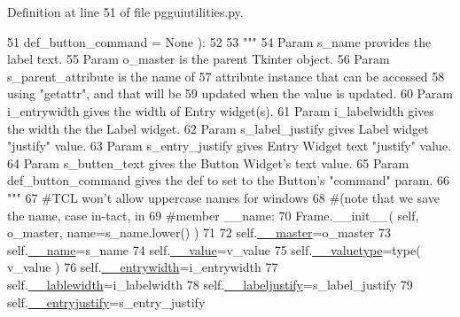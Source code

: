 Definition at line 51 of file pgguiutilities.\+py.


\begin{DoxyCode}
51             def\_button\_command = \textcolor{keywordtype}{None} ):
52         
53         \textcolor{stringliteral}{"""}
54 \textcolor{stringliteral}{        Param s\_name provides the label text.}
55 \textcolor{stringliteral}{        Param o\_master is the parent Tkinter object.}
56 \textcolor{stringliteral}{        Param s\_parent\_attribute is the name of }
57 \textcolor{stringliteral}{            attribute instance that can be accessed}
58 \textcolor{stringliteral}{            using "getattr", and that will be}
59 \textcolor{stringliteral}{            updated when the value is updated.}
60 \textcolor{stringliteral}{        Param i\_entrywidth gives the width of Entry widget(s).}
61 \textcolor{stringliteral}{        Param i\_labelwidth gives the width the the Label widget.}
62 \textcolor{stringliteral}{        Param s\_label\_justify gives Label widget "justify" value.}
63 \textcolor{stringliteral}{        Param s\_entry\_justify gives Entry Widget text "justify" value.}
64 \textcolor{stringliteral}{        Param s\_butten\_text gives the Button Widget's text value.}
65 \textcolor{stringliteral}{        Param def\_button\_command gives the def to set to the Button's "command" param.}
66 \textcolor{stringliteral}{        """}
67         \textcolor{comment}{#TCL won't allow uppercase names for windows}
68         \textcolor{comment}{#(note that we save the name, case in-tact, in}
69         \textcolor{comment}{#member \_\_name:}
70         Frame.\_\_init\_\_( self, o\_master, name=s\_name.lower() )
71 
72         self.\hyperlink{classpgguiutilities_1_1KeyValFrame_a9ed6687b83a04cd14ece90f98a31db9e}{\_\_master}=o\_master
73         self.\hyperlink{classpgguiutilities_1_1KeyValFrame_af59a4bb0d9e69cd30aaa7a9451f9d5f5}{\_\_name}=s\_name
74         self.\hyperlink{classpgguiutilities_1_1KeyValFrame_a7dfeedb4c2b5ba27b08b56f3b6c230f0}{\_\_value}=v\_value
75         self.\hyperlink{classpgguiutilities_1_1KeyValFrame_a33c188d7ffcd4a62b10587230ad74e02}{\_\_valuetype}=type( v\_value )
76         self.\hyperlink{classpgguiutilities_1_1KeyValFrame_a0a9f8527e8d3f2b4cf0224daca2d08df}{\_\_entrywidth}=i\_entrywidth
77         self.\hyperlink{classpgguiutilities_1_1KeyValFrame_ab16516c2a13dfa41130bdea111732142}{\_\_lablewidth}=i\_labelwidth
78         self.\hyperlink{classpgguiutilities_1_1KeyValFrame_a9b4ff58e864b4976d1f1762d7b29bf49}{\_\_labeljustify}=s\_label\_justify
79         self.\hyperlink{classpgguiutilities_1_1KeyValFrame_a0a464ba7eab597a5dd1c92a6e230a315}{\_\_entryjustify}=s\_entry\_justify

\end{DoxyCode}
